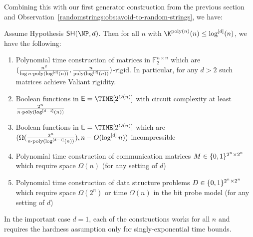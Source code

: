 Combining this with our first generator construction from the previous section and Observation~\ref{randomstrings:obs:avoid-to-random-strings}, we have:
\begin{theorem}\label{randomstrings:thm:conditional-ecs-strong}
Assume Hypothesis $\SH(\NP,d)$. Then for all $n$ with $\K^{\poly(n)}(n) \leq \log^{[d]}(n)$, we have the following:
\begin{enumerate}
    \item \sloppy Polynomial time construction of matrices in $\mathbb{F}_2^{n \times n}$ which are $(\frac{n^2}{\log n\cdot  \mathrm{poly}(\log^{[d]}(n))}, \frac{n}{\mathrm{poly}(\log^{[d]}(n))})$-rigid. In particular, for any $d > 2$ such matrices achieve Valiant rigidity.
    \item Boolean functions in $\mathsf{E} = \TIME[2^{O(n)}]$ with circuit complexity at least $ \frac{2^n}{n \cdot \mathrm{poly}(\log^{[d-1]}(n))}$
    \item \sloppy Boolean functions in $\mathsf{E} = \TIME[2^{O(n)}]$ which are ${(\Omega(\frac{2^n}{n \cdot \mathrm{poly}(\log^{[d-1]}(n))}), n- O(\log^{[d]}n))}$ incompressible
    \item Polynomial time construction of communication matrices $M \in \{0,1\}^{2^n \times 2^n}$ which require space $\Omega(n)$ (for any setting of $d$)
    \item Polynomial time construction of data structure problems $D \in \{0,1\}^{2^n \times 2^n}$ which require space $\Omega(2^n)$ or time $\Omega(n)$ in the bit probe model (for any setting of $d$)
\end{enumerate}
In the important case $d = 1$, each of the constructions works for all $n$ and requires the hardness assumption only for singly-exponential time bounds.
\end{theorem}

